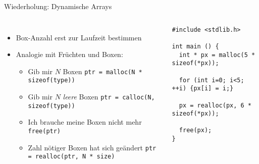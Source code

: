 \begin{frame}[fragile]{Wiederholung: Dynamische Arrays}
%
\begin{columns}[T]
\begin{itemize}
\item Box-Anzahl erst zur Laufzeit bestimmen
\item Analogie mit Früchten und Boxen:
	\begin{itemize}
	\item Gib mir $N$ Boxen \newline 
		\Thus \footnotesize \texttt{ptr = malloc(N * sizeof(type))}\\
		\vspace{6pt}
	\item \small Gib mir $N$ \emph{leere} Boxen \newline 
		\Thus \footnotesize \texttt{ptr = calloc(N, sizeof(type))}\\
		\vspace{6pt}
	\item \small Ich brauche meine Boxen nicht mehr \newline
		\Thus \footnotesize \texttt{free(ptr)}\\
		\vspace{6pt}
	\item \small Zahl nötiger Boxen hat sich geändert \newline
		\Thus \footnotesize \texttt{ptr = realloc(ptr, N * size)}
	\end{itemize}
\end{itemize}
%
\vspace{-5pt}
\begin{codebox}
\begin{verbatim}
#include <stdlib.h>

int main () {
  int * px = malloc(5 * sizeof(*px));

  for (int i=0; i<5; ++i) {px[i] = i;}

  px = realloc(px, 6 * sizeof(*px));

  free(px);
}
\end{verbatim}
\end{codebox}
\end{columns}
%
\end{frame}


